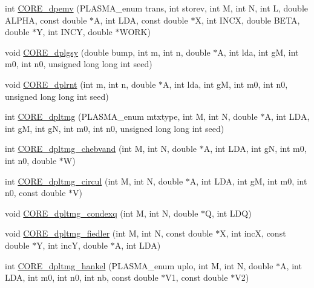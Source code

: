 \begin{DoxyCompactItemize}
\item 
int \hyperlink{group__CORE__double_ga7e36702038ad3e238158fef1dc86eb61_ga7e36702038ad3e238158fef1dc86eb61}{C\+O\+R\+E\+\_\+dpemv} (P\+L\+A\+S\+M\+A\+\_\+enum trans, int storev, int M, int N, int L, double A\+L\+P\+H\+A, const double $\ast$A, int L\+D\+A, const double $\ast$X, int I\+N\+C\+X, double B\+E\+T\+A, double $\ast$Y, int I\+N\+C\+Y, double $\ast$W\+O\+R\+K)
\item 
void \hyperlink{group__CORE__double_gae5ff912cce66f5666d5b76fb7da5e9e2_gae5ff912cce66f5666d5b76fb7da5e9e2}{C\+O\+R\+E\+\_\+dplgsy} (double bump, int m, int n, double $\ast$A, int lda, int g\+M, int m0, int n0, unsigned long long int seed)
\item 
void \hyperlink{group__CORE__double_gaf3c013847f99f3d28eb16c98ae5c4e11_gaf3c013847f99f3d28eb16c98ae5c4e11}{C\+O\+R\+E\+\_\+dplrnt} (int m, int n, double $\ast$A, int lda, int g\+M, int m0, int n0, unsigned long long int seed)
\item 
int \hyperlink{group__CORE__double_ga676f991618b7d88938f1d6d19d4eabc8_ga676f991618b7d88938f1d6d19d4eabc8}{C\+O\+R\+E\+\_\+dpltmg} (P\+L\+A\+S\+M\+A\+\_\+enum mtxtype, int M, int N, double $\ast$A, int L\+D\+A, int g\+M, int g\+N, int m0, int n0, unsigned long long int seed)
\item 
int \hyperlink{group__CORE__double_gab0f1d5c66afbf4770932b2a61a32b837_gab0f1d5c66afbf4770932b2a61a32b837}{C\+O\+R\+E\+\_\+dpltmg\+\_\+chebvand} (int M, int N, double $\ast$A, int L\+D\+A, int g\+N, int m0, int n0, double $\ast$W)
\item 
int \hyperlink{group__CORE__double_ga548433b2a88abe28bcf0dafdb7777833_ga548433b2a88abe28bcf0dafdb7777833}{C\+O\+R\+E\+\_\+dpltmg\+\_\+circul} (int M, int N, double $\ast$A, int L\+D\+A, int g\+M, int m0, int n0, const double $\ast$V)
\item 
void \hyperlink{group__CORE__double_ga230f3c575fe0c38f1e59a7671ab111a1_ga230f3c575fe0c38f1e59a7671ab111a1}{C\+O\+R\+E\+\_\+dpltmg\+\_\+condexq} (int M, int N, double $\ast$Q, int L\+D\+Q)
\item 
void \hyperlink{group__CORE__double_gae0a46d5ef37e8689c3ace89dac0d7d46_gae0a46d5ef37e8689c3ace89dac0d7d46}{C\+O\+R\+E\+\_\+dpltmg\+\_\+fiedler} (int M, int N, const double $\ast$X, int inc\+X, const double $\ast$Y, int inc\+Y, double $\ast$A, int L\+D\+A)
\item 
int \hyperlink{group__CORE__double_gade5dc2c549c2f807eb633058637786fb_gade5dc2c549c2f807eb633058637786fb}{C\+O\+R\+E\+\_\+dpltmg\+\_\+hankel} (P\+L\+A\+S\+M\+A\+\_\+enum uplo, int M, int N, double $\ast$A, int L\+D\+A, int m0, int n0, int nb, const double $\ast$V1, const double $\ast$V2)

\end{DoxyCompactItemize}
